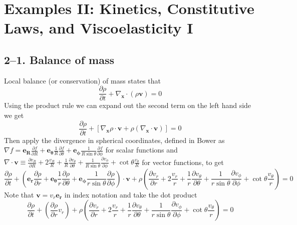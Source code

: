 \documentclass[preprint,12pt,authoryear]{elsarticle}
\begin{document}


\section*{Examples II: Kinetics, Constitutive Laws, and Viscoelasticity I}
\label{PS2}

\medskip
\subsection*{2--1. \textbf{Balance of mass}}
Local balance (or conservation) of mass states that
\begin{equation}
    \frac{\partial \rho}{\partial t} + \nabla_{\bm{x}} \cdot (\rho \bm{v}) = 0
\end{equation}
Using the product rule we can expand out the second term on the left hand side we get
\begin{equation}
    \frac{\partial \rho}{\partial t} + [\nabla_{\bm{x}} \rho \cdot \bm{v} + \rho (\nabla_{\bm{x}} \cdot \bm{v})] = 0
\end{equation}
Then apply the divergence in spherical coordinates, defined in Bower as $\nabla f = \bm{e_R}\frac{\partial f}{\partial R} + \bm{e_{\theta}}\frac{1}{R}\frac{\partial f}{\partial \theta} + \bm{e_{\phi}}\frac{1}{R\sin{\theta}}\frac{\partial f}{\partial \phi}$ for scalar functions and $\nabla \cdot \bm{v} \equiv \frac{\partial v_R}{\partial R} + 2\frac{v_R}{R} + \frac{1}{R}\frac{\partial v_{\theta}}{\partial \theta} + \frac{1}{R \sin{\theta}}\frac{\partial v_{\phi}}{\partial \phi} + \cot{\theta}\frac{v_{\theta}}{R}$ for vector functions, to get
\begin{equation}
    \frac{\partial \rho}{\partial t} + (\bm{e_r}\frac{\partial \rho}{\partial r} + \bm{e_{\theta}}\frac{1}{r}\frac{\partial \rho}{\partial \theta} + \bm{e_{\phi}}\frac{1}{r\sin{\theta}}\frac{\partial \rho}{\partial \phi})\cdot \bm{v} + \rho(\frac{\partial v_r}{\partial r} + 2\frac{v_r}{r} + \frac{1}{r}\frac{\partial v_{\theta}}{\partial \theta} + \frac{1}{r \sin{\theta}}\frac{\partial v_{\phi}}{\partial \phi} + \cot{\theta}\frac{v_{\theta}}{r})= 0
\end{equation}
Note that $\bm{v} = v_r \bm{e_r}$ in index notation and take the dot product
\begin{equation}
    \frac{\partial \rho}{\partial t} + (\frac{\partial \rho}{\partial r}v_r) + \rho(\frac{\partial v_r}{\partial r} + 2\frac{v_r}{r} + \frac{1}{r}\frac{\partial v_{\theta}}{\partial \theta} + \frac{1}{r \sin{\theta}}\frac{\partial v_{\phi}}{\partial \phi} + \cot{\theta}\frac{v_{\theta}}{r})= 0
\end{equation}
\end{document}
